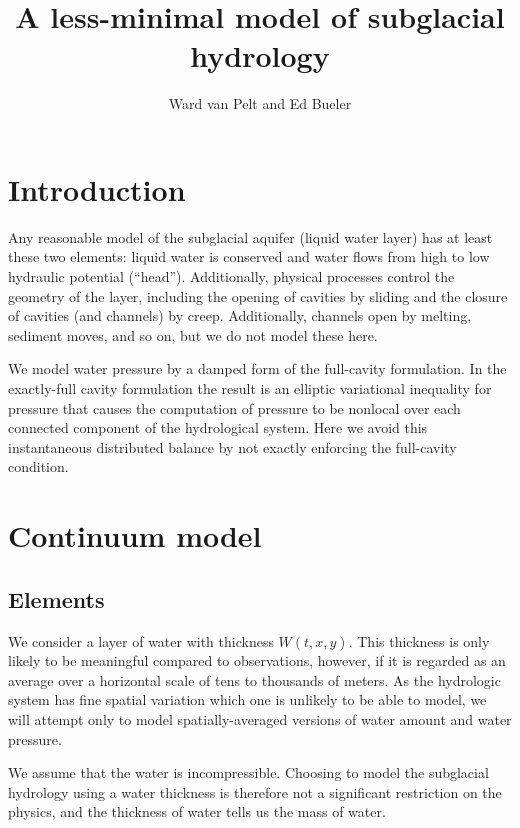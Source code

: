\documentclass[12pt,final]{amsart}%
\title[]{A less-minimal model of subglacial hydrology}
\author[]{Ward van Pelt and Ed Bueler}
\begin{document}
\maketitle

\thispagestyle{empty}


\section{Introduction}

Any reasonable model of the subglacial aquifer (liquid water layer) has at least these two elements: liquid water is conserved and water flows from high to low hydraulic potential  (``head'').  Additionally, physical processes control the geometry of the layer, including the opening of cavities by sliding and the closure of cavities (and channels) by creep.  Additionally, channels open by melting, sediment moves, and so on, but we do not model these here.

We model water pressure by a damped form of the full-cavity formulation.  In the exactly-full cavity formulation the result is an elliptic variational inequality \citep{Schoofetal2012} for pressure that causes the computation of pressure to be nonlocal over each connected component of the hydrological system.  Here we avoid this instantaneous distributed balance by not exactly enforcing the full-cavity condition.


\section{Continuum model}

\subsection*{Elements}  We consider a layer of water with thickness $W(t,x,y)$.  This thickness is only likely to be meaningful compared to observations, however, if it is regarded as an average over a horizontal scale of tens to thousands of meters.  As the hydrologic system has fine spatial variation which one is unlikely to be able to model, we will attempt only to model spatially-averaged versions of water amount and water pressure.

We assume that the water is incompressible.  Choosing to model the subglacial hydrology using a water thickness is therefore not a significant restriction on the physics, and the thickness of water tells us the mass of water.
\end{document}
